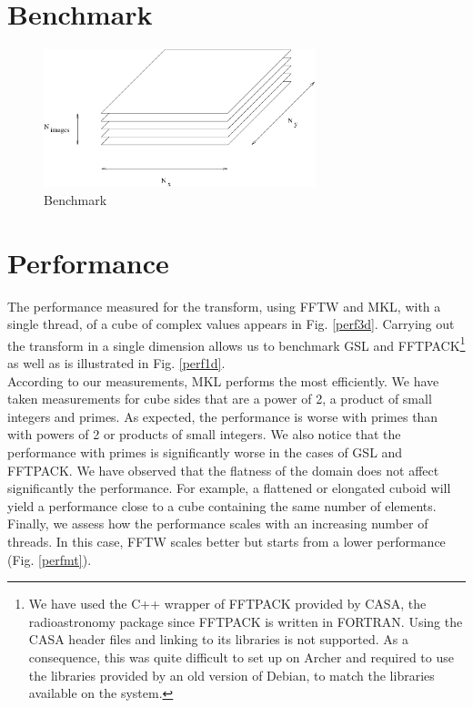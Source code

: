 \documentclass[12pt, a4paper]{article}
\begin{document}
\section{Benchmark}
\begin{figure}[H]
\captionsetup{width=0.6\textwidth}
\centering
\includegraphics[height=4cm]{benchmark.pdf}
\caption{Benchmark}
\label{benchmark}
\end{figure}

\section{Performance}

The performance measured for the transform, using FFTW and MKL, with a single thread, of a cube of complex values appears in Fig. \ref{perf3d}. Carrying out the transform in a single dimension allows us to benchmark GSL and FFTPACK\footnote{We have used the C++ wrapper of FFTPACK provided by CASA, the radioastronomy package \cite{casa} since FFTPACK is written in FORTRAN. Using the CASA header files and linking to its libraries is not supported. As a consequence, this was quite difficult to set up on Archer and required to use the libraries provided by an old version of Debian, to match the libraries available on the system.} as well as is illustrated in Fig. \ref{perf1d}.\\

According to our measurements, MKL performs the most efficiently. We have taken measurements for cube sides that are a power of 2, a product of small integers and primes. As expected, the performance is worse with primes than with powers of 2 or products of small integers. We also notice that the performance with primes is significantly worse in the cases of GSL and FFTPACK. We have observed that the flatness of the domain does not affect significantly the performance. For example, a flattened or elongated cuboid will yield a performance close to a cube containing the same number of elements.\\

Finally, we assess how the performance scales with an increasing number of threads. In this case, FFTW scales better but starts from a lower performance (Fig. \ref{perfmt}).
\end{document}

